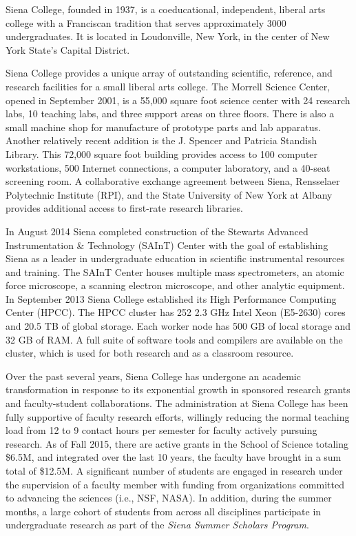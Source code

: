 \documentclass[12pt, preprint]{aastex}
\begin{document}
Siena College, founded in 1937, is a coeducational, independent, liberal arts
college with a Franciscan tradition that serves approximately 3000
undergraduates. It is located in Loudonville, New York, in the center of New
York State's Capital District.
					
Siena College provides a unique array of outstanding scientific, reference, and
research facilities for a small liberal arts college.  The Morrell Science
Center, opened in September 2001, is a 55,000 square foot science center with 24
research labs, 10 teaching labs, and three support areas on three floors.  There
is also a small machine shop for manufacture of prototype parts and lab
apparatus.  Another relatively recent addition is the J. Spencer and Patricia
Standish Library. This 72,000 square foot building provides access to 100
computer workstations, 500 Internet connections, a computer laboratory, and a
40-seat screening room. A collaborative exchange agreement between Siena,
Rensselaer Polytechnic Institute (RPI), and the State University of New York at
Albany provides additional access to first-rate research libraries.

In August 2014 Siena completed construction of the Stewarts Advanced
Instrumentation \& Technology (SAInT) Center with the goal of establishing Siena
as a leader in undergraduate education in scientific instrumental resources and
training. The SAInT Center houses multiple mass spectrometers, an atomic force
microscope, a scanning electron microscope, and other analytic equipment.  In
September 2013 Siena College established its High Performance Computing Center
(HPCC).  The HPCC cluster has 252 2.3 GHz Intel Xeon (E5-2630) cores and 20.5 TB
of global storage.  Each worker node has 500 GB of local storage and 32 GB of
RAM. A full suite of software tools and compilers are available on the cluster,
which is used for both research and as a classroom resource.

Over the past several years, Siena College has undergone an academic
transformation in response to its exponential growth in sponsored research
grants and faculty-student collaborations.  The administration at Siena College
has been fully supportive of faculty research efforts, willingly reducing the
normal teaching load from 12 to 9 contact hours per semester for faculty
actively pursuing research.  As of Fall 2015, there are active grants in the
School of Science totaling \$6.5M, and integrated over the last 10 years, the
faculty have brought in a sum total of \$12.5M.  A significant number of
students are engaged in research under the supervision of a faculty member with
funding from organizations committed to advancing the sciences (i.e., NSF,
NASA).  In addition, during the summer months, a large cohort of students from
across all disciplines participate in undergraduate research as part of the
{\em Siena Summer Scholars Program}.
	
\end{document}
